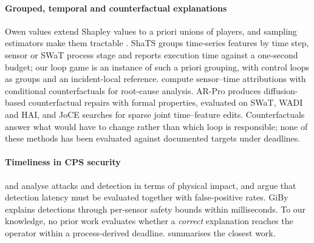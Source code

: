 \paragraph{Grouped, temporal and counterfactual explanations}
Owen values \citep{owen1977unions} extend Shapley values \citep{shapley1953value} to a priori unions of players, and sampling estimators make them tractable \citep{castro2009sampling,strumbelj2014explaining,lundberg2017shap}. ShaTS \citep{franco2026shats} groups time-series features by time step, sensor or SWaT process stage and reports execution time against a one-second budget; our loop game is an instance of such a priori grouping, with control loops as groups and an incident-local reference. \citet{mishra2026conditional} compute sensor--time attributions with conditional counterfactuals for root-cause analysis. AR-Pro \citep{ji2024arpro} produces diffusion-based counterfactual repairs with formal properties, evaluated on SWaT, WADI and HAI, and JoCE \citep{jeong2026joce} searches for sparse joint time--feature edits. Counterfactuals answer what would have to change rather than which loop is responsible; none of these methods has been evaluated against documented targets under deadlines.

\paragraph{Timeliness in CPS security}
\citet{cardenas2011attacks} and \citet{urbina2016limiting} analyse attacks and detection in terms of physical impact, and \citet{puccetti2026latency} argue that detection latency must be evaluated together with false-positive rates. GiBy \citep{venugopalan2025giby} explains detections through per-sensor safety bounds within milliseconds. To our knowledge, no prior work evaluates whether a \emph{correct} explanation reaches the operator within a process-derived deadline.  summarises the closest work.

